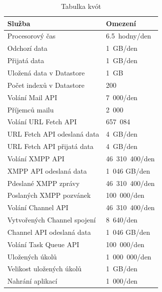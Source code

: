 \begin{table}[h]
\centering
\caption{Tabulka kvót}\label{tab:quotas}
\begin{tabular}{|l|l|}
   \hline
     Služba & Omezení \\
   \hline
    Procesorový čas & 6.5~hodny/den \\
    Odchozí data & 1~GB/den \\
    Přijatá data &1~GB/den \\
    Uložená data v Datastore & 1~GB \\
    Počet indexů v Datastore & 200 \\
    Volání Mail API & 7~000/den \\ 
    Příjemců mailu & 2~000 \\
    Volání URL Fetch API & 657~084 \\
    URL Fetch API odeslaná data  & 4~GB/den \\
    URL Fetch API přijatá data  & 4~GB/den \\
    Volání XMPP API & 46~310~400/den \\
    XMPP API odeslaná data & 1~046 GB/den \\
    Pdeslané XMPP zprávy & 46~310~400/den \\
    Poslaných XMPP pozvánek & 100~000/den \\
    Volání Channel API & 46~310~400/den \\
    Vytvořených Channel spojení & 8~640/den \\
    Channel API odeslaná data & 1~046  GB/den \\
    Volání Task Queue API & 100~000/den \\
    Uložených úkolů & 1~000~000/den \\
    Velikost uložených úkolů & 1~GB/den \\
    Nahrání aplikací & 1~000/den \\
   \hline
\end{tabular}
\end{table}

